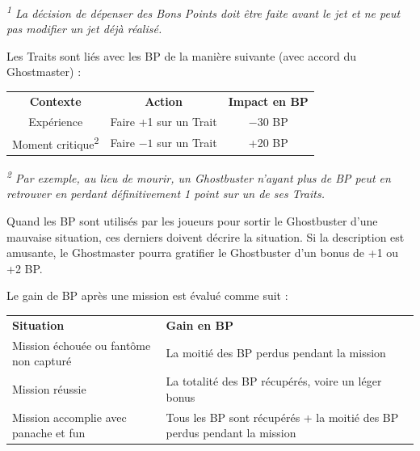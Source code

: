 \begin{frame}[b]
{\begin{minipage}[c][0.95\textheight][c]{\linewidth}
{\small \textit{\textsuperscript{1} La décision de dépenser des Bons Points doit être faite avant le jet et ne peut pas modifier un jet déjà réalisé.}}


\myindent Les Traits sont liés avec les BP de la manière suivante (avec accord du Ghostmaster) :

\begin{center}
\begin{tabular}{ccc}
\textbf{Contexte} & \textbf{Action} & \textbf{Impact en BP}\\
Expérience & Faire +1 sur un Trait & $-30$ BP \\
Moment critique\textsuperscript{2} & Faire $-1$ sur un Trait & +20 BP \\
\end{tabular}
\end{center}

{\small \textit{\textsuperscript{2} Par exemple, au lieu de mourir, un Ghostbuster n'ayant plus de BP peut en retrouver en perdant définitivement 1 point sur un de ses Traits.}}

\myindent Quand les BP sont utilisés par les joueurs pour sortir le Ghostbuster d'une mauvaise situation, ces derniers doivent décrire la situation. Si la description est amusante, le Ghostmaster pourra gratifier le Ghostbuster d'un bonus de +1 ou +2 BP.


\myindent Le gain de BP après une mission est évalué comme suit :

\begin{center}\begin{tabular}{>{\centering\arraybackslash}p{3cm}>{\centering\arraybackslash}p{5cm}}
\textbf{Situation} & \textbf{Gain en BP}\\
Mission échouée ou fantôme non capturé & La moitié des BP perdus pendant la mission \\
Mission réussie & La totalité des BP récupérés, voire un léger bonus \\
Mission accomplie avec panache et fun & Tous les BP sont récupérés + la moitié des BP perdus pendant la mission \\
\end{tabular}
\end{center}
\end{minipage}
}
\end{frame}

